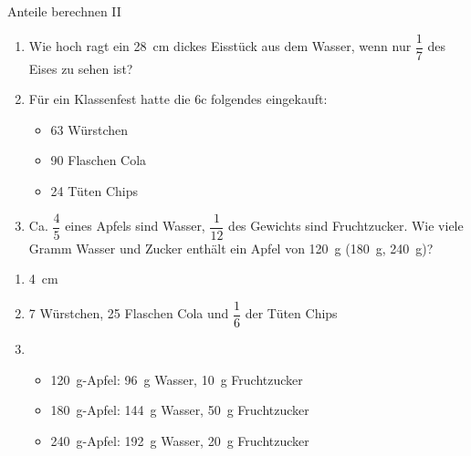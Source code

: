 \documentclass[lerntheke,12pt,a5paper,landscape]{arbeitsblatt}
\begin{document}
	\begin{karte2}{Anteile berechnen II}
		\begin{enumerate}
			\item Wie hoch ragt ein \SI{28}{\centi\meter} dickes Eisstück aus dem Wasser, wenn nur $\dfrac{1}{7}$ des Eises zu sehen ist?

			\item Für ein Klassenfest hatte die 6c folgendes eingekauft:
			\begin{itemize}
				\item 63 Würstchen
				\item 90 Flaschen Cola
				\item 24 Tüten Chips
			\end{itemize}

			\item Ca. $\dfrac{4}{5}$ eines Apfels sind Wasser, $\dfrac{1}{12}$ des Gewichts sind Fruchtzucker. Wie viele Gramm Wasser und Zucker enthält ein Apfel von \SI{120}{\gram} (\SI{180}{\gram},  \SI{240}{\gram})?
		\end{enumerate}
	\end{karte2}

	\begin{loesungskarte}
		\begin{enumerate}
			\item \SI{4}{\centi\meter}

			\item 7 Würstchen, 25 Flaschen Cola und $\dfrac{1}{6}$ der Tüten Chips

			\item \begin{itemize}
				\item \SI{120}{\gram}-Apfel:\hspace{1cm} \SI{96}{\gram} Wasser, \SI{10}{\gram} Fruchtzucker
				\item \SI{180}{\gram}-Apfel:\hspace{1cm} \SI{144}{\gram} Wasser, \SI{50}{\gram} Fruchtzucker
				\item \SI{240}{\gram}-Apfel:\hspace{1cm} \SI{192}{\gram} Wasser, \SI{20}{\gram} Fruchtzucker
			\end{itemize}
		\end{enumerate}
	\end{loesungskarte}
\end{document}
